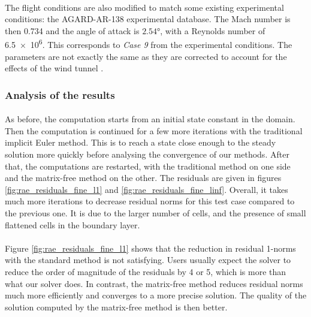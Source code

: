         \paragraph{}
        The flight conditions are also modified to match some existing experimental conditions: the AGARD-AR-138 experimental database.
        The Mach number is then 0.734 and the angle of attack is $2.54\si{\degree}$, with a Reynolds number of \num{6.5e6}.
        This corresponds to \emph{Case 9} from the experimental conditions.
        The parameters are not exactly the same as they are corrected to account for the effects of the wind tunnel \cite{HellstromDavidsonRizzi1994}.


      \subsubsection{Analysis of the results}

        \paragraph{}
        As before, the computation starts from an initial state constant in the domain.
        Then the computation is continued for a few more iterations with the traditional implicit Euler method.
        This is to reach a state close enough to the steady solution more quickly before analysing the convergence of our methods.
        After that, the computations are restarted, with the traditional method on one side and the matrix-free method on the other.
        The residuals are given in figures \ref{fig:rae_residuals_fine_l1} and \ref{fig:rae_residuals_fine_linf}.
        Overall, it takes much more iterations to decrease residual norms for this test case compared to the previous one.
        It is due to the larger number of cells, and the presence of small flattened cells in the boundary layer.

        \paragraph{}
        Figure \ref{fig:rae_residuals_fine_l1} shows that the reduction in residual 1-norms with the standard method is not satisfying.
        Users usually expect the solver to reduce the order of magnitude of the residuals by 4 or 5, which is more than what our solver does.
        In contrast, the matrix-free method reduces residual norms much more efficiently and converges to a more precise solution.
        The quality of the solution computed by the matrix-free method is then better.

